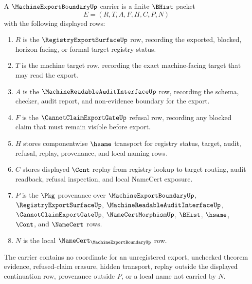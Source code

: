 \begin{definition}
\label{def:machine-export-boundary-carrier}
A $\MachineExportBoundaryUp$ carrier is a finite $\BHist$ packet
$$
E=(R,T,A,F,H,C,P,N)
$$
with the following displayed rows:
\begin{enumerate}
\item $R$ is the $\RegistryExportSurfaceUp$ row, recording the exported, blocked, horizon-facing, or formal-target registry status.
\item $T$ is the machine target row, recording the exact machine-facing target that may read the export.
\item $A$ is the $\MachineReadableAuditInterfaceUp$ row, recording the schema, checker, audit report, and non-evidence boundary for the export.
\item $F$ is the $\CannotClaimExportGateUp$ refusal row, recording any blocked claim that must remain visible before export.
\item $H$ stores componentwise $\hsame$ transport for registry status, target, audit, refusal, replay, provenance, and local naming rows.
\item $C$ stores displayed $\Cont$ replay from registry lookup to target routing, audit readback, refusal inspection, and local NameCert exposure.
\item $P$ is the $\Pkg$ provenance over $\MachineExportBoundaryUp$, $\RegistryExportSurfaceUp$, $\MachineReadableAuditInterfaceUp$, $\CannotClaimExportGateUp$, $\NameCertMorphismUp$, $\BHist$, $\hsame$, $\Cont$, and $\NameCert$ rows.
\item $N$ is the local $\NameCert_{\MachineExportBoundaryUp}$ row.
\end{enumerate}
The carrier contains no coordinate for an unregistered export, unchecked theorem evidence, refused-claim erasure, hidden transport, replay outside the displayed continuation row, provenance outside $P$, or a local name not carried by $N$.
\end{definition}

